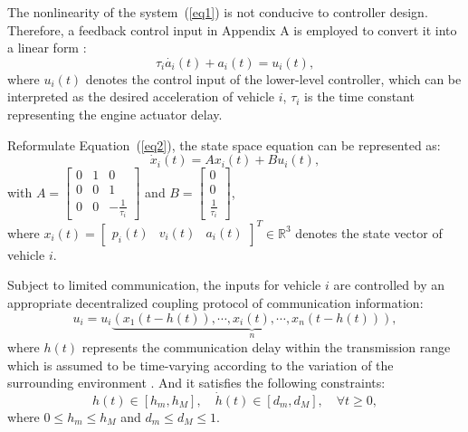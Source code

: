 \documentclass[a4paper]{cas-sc}
\begin{document}
The nonlinearity of the system~(\ref{eq1}) is not conducive to controller design. Therefore, a feedback control input in Appendix A is employed to convert it into a linear form \citep{Wang2018}:
\begin{equation}
  \tau_i\dot{a_i}\left(t\right)+a_i\left(t\right)=u_i(t),
  \label{eq2}
\end{equation}
where $u_i(t)$ denotes the control input of the lower-level controller, which can be interpreted as the desired acceleration of vehicle $i$, $\tau_i$ is the time constant representing the engine actuator delay.

Reformulate Equation~(\ref{eq2}), the state space equation can be represented as:
\begin{equation}
  {\dot x_i}\left( t \right) = A{x_i}\left( t \right) + B{u_i}\left( t \right),
  \label{eq3}
\end{equation}
with $A = \left[ {\begin{array}{*{20}{c}}
          0 & 1 & 0                          \\
          0 & 0 & 1                          \\
          0 & 0 & { - \frac{1}{{{\tau _i}}}}
        \end{array}} \right]$ and $B = \left[ {\begin{array}{*{20}{c}}
          0 \\
          0 \\
          {\frac{1}{{{\tau _i}}}}
        \end{array}} \right]$,\\
where ${x_i}\left( t \right) = {\left[ {\begin{array}{*{20}{c}}
          {{p_i}\left( t \right)} & {{v_i}\left( t \right)} & {{a_i}\left( t \right)}
        \end{array}} \right]^T} \in {\mathbb{R}^3}$ denotes the state vector of vehicle $i$.

Subject to limited communication, the inputs for vehicle $i$ are controlled by an appropriate decentralized coupling protocol of communication information:
\begin{equation}
  {u_i} = {u_i}\underbrace {\left( {{x_1}\left( {t - h(t)} \right), \cdots ,{x_i}\left( t \right), \cdots ,{x_n}\left( {t - h(t)} \right)} \right)}_n,
  \label{eq4}
\end{equation}
where $ h(t) $ represents the communication delay within the transmission range which is assumed to be time-varying according to the variation of the surrounding environment \citep{jia_enhanced_2016,Vukadinovic2018,Vu2020,Martin-Sacristan2020,Pirani2022}. And it satisfies the following constraints:
\begin{equation}
  h(t) \in \left[ {{h_m},{h_M}} \right],\quad \dot h(t) \in \left[ {{d_m},{d_M}} \right],\quad \forall t \geqslant 0,
  \label{eq5}
\end{equation}
where $ 0 \leqslant {h_m} \leqslant {h_M} $ and $ {d_m} \leqslant {d_M} \leqslant 1 $.
\end{document}
